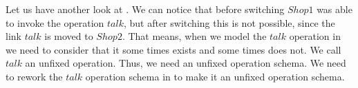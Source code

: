 Let us have another look at . We can notice that before switching $Shop1$ was able to invoke the operation $talk$, but after switching this is not possible, since the link $talk$ is moved to $Shop2$. That means, when we model the $talk$ operation in \oz{} we need to consider that it some times exists and some times does not. We call $talk$ an unfixed operation. Thus, we need an unfixed operation schema. We need to rework the $talk$ operation schema in  to make it an unfixed operation schema.


